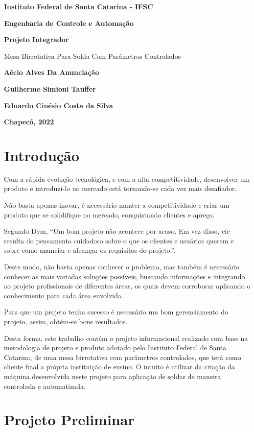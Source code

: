 \documentclass[]{article}
\date{}
\begin{document}
\textbf{Instituto Federal de Santa Catarina - IFSC}

\textbf{Engenharia de Controle e Automação}

\textbf{Projeto Integrador}

\protect\hypertarget{_rcmtlgrobc4b}{}{}Mesa Birrotativa Para Solda Com
Parâmetros Controlados

\textbf{Aécio Alves Da Anunciação}

\textbf{Guilherme Simioni Tauffer}

\textbf{Eduardo Cinésio Costa da Silva }

\textbf{Chapecó, 2022}

\protect\hypertarget{_2k5acx2zp81h}{}{}

\section{Introdução }\label{introduuxe7uxe3o}

Com a rápida evolução tecnológica, e com a alta competitividade,
desenvolver um produto e introduzi-lo no mercado está tornando-se cada
vez mais desafiador.

Não basta apenas inovar, é necessário manter a competitividade e criar
um produto que se solidifique no mercado, conquistando clientes e
apreço.

Segundo Dym, ``Um bom projeto não acontece por acaso. Em vez disso, ele
resulta do pensamento cuidadoso sobre o que os clientes e usuários
querem e sobre como anunciar e alcançar os requisitos do projeto.''.

Deste modo, não basta apenas conhecer o problema, mas também é
necessário conhecer as mais variadas soluções possíveis, buscando
informações e integrando ao projeto profissionais de diferentes áreas,
os quais devem corroborar aplicando o conhecimento para cada área
envolvida.

Para que um projeto tenha sucesso é necessário um bom gerenciamento do
projeto, assim, obtém-se bons resultados.

Desta forma, este trabalho contém o projeto informacional realizado com
base na metodologia de projeto e produto adotado pelo Instituto Federal
de Santa Catarina, de uma mesa birrotativa com parâmetros controlados,
que terá como cliente final a própria instituição de ensino. O intuito é
utilizar da criação da máquina desenvolvida neste projeto para aplicação
de soldas de maneira controlada e automatizada.

\section{Projeto Preliminar}\label{projeto-preliminar}
\end{document}
